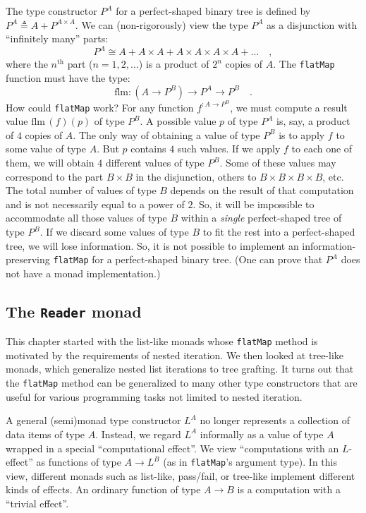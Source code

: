 The type constructor $P^{A}$ for a perfect-shaped binary tree is
defined by $P^{A}\triangleq A+P^{A\times A}$. We can (non-rigorously)
view the type $P^{A}$ as a disjunction with \textsf{``}infinitely many\textsf{''}
parts:
\[
P^{A}\cong A+A\times A+A\times A\times A\times A+...\quad,
\]
where the $n^{\text{th}}$ part ($n=1,2,...$) is a product of $2^{n}$
copies of $A$. The \lstinline!flatMap! function must have the type:
\[
\text{flm}:(A\rightarrow P^{B})\rightarrow P^{A}\rightarrow P^{B}\quad.
\]
How could \lstinline!flatMap! work? For any function $f^{:A\rightarrow P^{B}}$,
we must compute a result value $\text{flm}\,(f)(p)$ of type $P^{B}$.
A possible value $p$ of type $P^{A}$ is, say, a product of $4$
copies of $A$. The only way of obtaining a value of type $P^{B}$
is to apply $f$ to some value of type $A$. But $p$ contains $4$
such values. If we apply $f$ to each one of them, we will obtain
$4$ different values of type $P^{B}$. Some of these values may correspond
to the part $B\times B$ in the disjunction, others to $B\times B\times B\times B$,
etc. The total number of values of type $B$ depends on the result
of that computation and is not necessarily equal to a power of $2$.
So, it will be impossible to accommodate all those values of type
$B$ within a \emph{single} perfect-shaped tree of type $P^{B}$.
If we discard some values of type $B$ to fit the rest into a perfect-shaped
tree, we will lose information. So, it is not possible to implement
an information-preserving \lstinline!flatMap! for a perfect-shaped
binary tree. (One can prove that $P^{A}$ does not have a monad implementation.)

\subsection{The \texttt{Reader} monad\label{subsec:The-Reader-monad}}

This chapter started
with the list-like monads whose \lstinline!flatMap! method is motivated
by the requirements of nested iteration. We then looked at tree-like
monads, which generalize nested list iterations to tree grafting.
It turns out that the \lstinline!flatMap! method can be generalized
to many other type constructors that are useful for various programming
tasks not limited to nested iteration.

A general (semi)monad type constructor $L^{A}$ no longer represents
a collection of data items of type $A$. Instead, we regard $L^{A}$
informally as a value of type $A$ wrapped in a special \textsf{``}computational
effect\textsf{''}. We view \textsf{``}computations with an $L$-effect\textsf{''} as functions
of type $A\rightarrow L^{B}$ (as in \lstinline!flatMap!\textsf{'}s argument
type). In this view, different monads \textemdash{} such as list-like,
pass/fail, or tree-like \textemdash{} implement different kinds of
effects. An ordinary function of type $A\rightarrow B$ is a computation
with a \textsf{``}trivial effect\textsf{''}.

